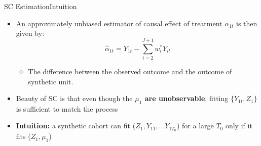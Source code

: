 \documentclass[hyperref={pdfpagelabels=false}]{beamer}
\begin{document}
\begin{frame}{SC Estimation}{Intuition}
\begin{itemize}
\item An approximately unbiased estimator of causal effect of treatment $\alpha_{1t}$ is then given by:
\begin{equation*}
\hat{\alpha}_{1t}=Y_{1t}-\sum^{J+1}_{i=2}w^*_iY_{it}
\end{equation*}

\begin{itemize}
\item The difference between the observed outcome and the outcome of synthetic unit.

\end{itemize}

\vspace{0.2cm}
\item Beauty of SC is that even though the \textbf{$\mu_1$ are unobservable}, fitting $\{Y_{1t},Z_{1}\}$ is sufficient to match the process
\vspace{0.2cm}
\item \textbf{Intuition:} a synthetic cohort can fit ($Z_{1},Y_{11},...Y_{1T_{0}} $) for a large $T_{0}$ only if it fits ($Z_{1},\mu_{1} $)
\end{itemize}
\end{frame}


%	
%			
%			
%			
%			
%
%			
%			
%		
%			
%		
\end{document}
